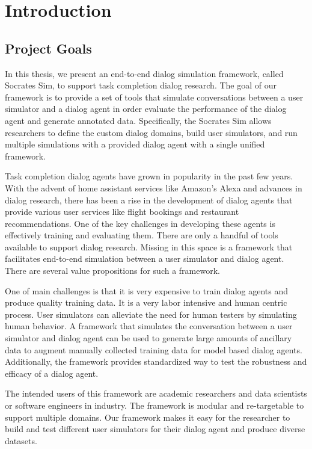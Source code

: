 \chapter{Introduction}

\section{Project Goals}

In this thesis, we present an end-to-end dialog simulation framework, called Socrates Sim, to support task completion dialog research. The goal of our framework is to provide a set of tools that simulate conversations between a user simulator and a dialog agent in order evaluate the performance of the dialog agent and generate annotated data. Specifically, the Socrates Sim allows researchers to define the custom dialog domains, build user simulators, and run multiple simulations with a provided dialog agent with a single unified framework. 

Task completion dialog agents have grown in popularity in the past few years. With the advent of home assistant services like Amazon's Alexa and advances in dialog research, there has been a rise in the development of dialog agents that provide various user services like flight bookings and restaurant recommendations. One of the key challenges in developing these agents is effectively training and evaluating them. There are only a handful of tools available to support dialog research. Missing in this space is a framework that facilitates end-to-end simulation between a user simulator and dialog agent. There are several value propositions for such a framework.

One of main challenges is that it is very expensive to train dialog agents and produce quality training data. It is a very labor intensive and human centric process. User simulators can alleviate the need for human testers by simulating human behavior. A framework that simulates the conversation between a user simulator and dialog agent can be used to generate large amounts of ancillary data to augment manually collected training data for model based dialog agents. Additionally, the framework provides standardized way to test the robustness and efficacy of a dialog agent.

The intended users of this framework are academic researchers and data scientists or software engineers in industry. The framework is modular and re-targetable to support multiple domains. Our framework makes it easy for the researcher to build and test different user simulators for their dialog agent and produce diverse datasets. 

